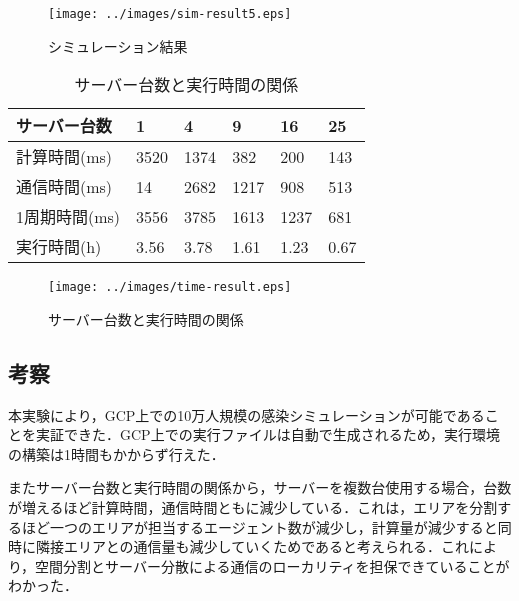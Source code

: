 \documentclass[originalpaper]{jsaiart}     %
\begin{document}
\begin{figure}[t]
    \begin{center}
        \texttt{[image: ../images/sim-result5.eps]}
    \end{center}
    \caption{シミュレーション結果}
    \label{dummy}
\end{figure}

\begin{table}[t]
	\begin{center}
	  \caption{サーバー台数と実行時間の関係}
	  \begin{tabular}{|l|l|l|l|l|l|} \hline
		サーバー台数 & 1 & 4& 9& 16& 25\\\hline
        計算時間(ms) & 3520& 1374& 382& 200& 143\\
        通信時間(ms) &  14& 2682& 1217& 908& 513\\
        1周期時間(ms) & 3556& 3785& 1613& 1237& 681\\
        実行時間(h) & 3.56 & 3.78& 1.61& 1.23& 0.67\\ \hline
	 \end{tabular}
	  \label{tab:environment}
	\end{center}
  \end{table}

\begin{figure}[t]
    \begin{center}
        \texttt{[image: ../images/time-result.eps]}
    \end{center}
    \caption{サーバー台数と実行時間の関係}
    \label{dummy}
\end{figure}

\subsection{考察}
本実験により，GCP上での10万人規模の感染シミュレーションが可能であることを実証できた．GCP上での実行ファイルは自動で生成されるため，実行環境の構築は1時間もかからず行えた．

またサーバー台数と実行時間の関係から，サーバーを複数台使用する場合，台数が増えるほど計算時間，通信時間ともに減少している．これは，エリアを分割するほど一つのエリアが担当するエージェント数が減少し，計算量が減少すると同時に隣接エリアとの通信量も減少していくためであると考えられる．これにより，空間分割とサーバー分散による通信のローカリティを担保できていることがわかった．
\end{document}
